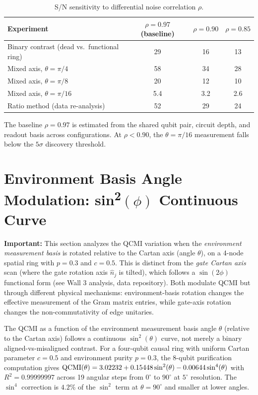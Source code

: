 \documentclass[aps,prl,superscriptaddress,nofootinbib]{revtex4-2}
\begin{document}
\begin{table}[h]
\caption{S/N sensitivity to differential noise correlation $\rho$.}
\label{tab:snr1}
\begin{ruledtabular}
\begin{tabular}{lccc}
Experiment & $\rho=0.97$ (baseline) & $\rho=0.90$ & $\rho=0.85$ \\
\hline
Binary contrast (dead vs.\ functional ring) & 29 & 16 & 13 \\
Mixed axis, $\theta=\pi/4$ & 58 & 34 & 28 \\
Mixed axis, $\theta=\pi/8$ & 20 & 12 & 10 \\
Mixed axis, $\theta=\pi/16$ & 5.4 & 3.2 & 2.6 \\
Ratio method (data re-analysis) & 52 & 29 & 24 \\
\end{tabular}
\end{ruledtabular}
\vspace{4pt}

The baseline $\rho=0.97$ is estimated from the shared qubit pair, circuit depth, and readout basis across configurations. At $\rho<0.90$, the $\theta=\pi/16$ measurement falls below the $5\sigma$ discovery threshold.
\end{table}


\section{Environment Basis Angle Modulation: sin\textsuperscript{2}$(\phi)$ Continuous Curve}

\textbf{Important:} This section analyzes the QCMI variation when the \textit{environment measurement basis} is rotated relative to the Cartan axis (angle $\theta$), on a 4-node spatial ring with $p=0.3$ and $c=0.5$. This is distinct from the \textit{gate Cartan axis} scan (where the gate rotation axis $\hat{n}_j$ is tilted), which follows a $\sin(2\phi)$ functional form (see Wall 3 analysis, data repository). Both modulate QCMI but through different physical mechanisms: environment-basis rotation changes the effective measurement of the Gram matrix entries, while gate-axis rotation changes the non-commutativity of edge unitaries.

The QCMI as a function of the environment measurement basis angle $\theta$ (relative to the Cartan axis) follows a continuous $\sin^2(\theta)$ curve, not merely a binary aligned-vs-misaligned contrast. For a four-qubit causal ring with uniform Cartan parameter $c=0.5$ and environment purity $p=0.3$, the 8-qubit purification computation gives ${\rm QCMI}(\theta) = 3.02232 + 0.15448\sin^2(\theta) - 0.00644\sin^4(\theta)$ with $R^2 = 0.99999997$ across 19 angular steps from $0^\circ$ to $90^\circ$ at $5^\circ$ resolution. The $\sin^4$ correction is $4.2\%$ of the $\sin^2$ term at $\theta=90^\circ$ and smaller at lower angles.
\end{document}
